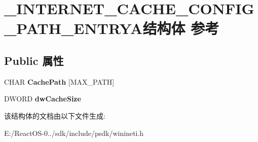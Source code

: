 \hypertarget{struct___i_n_t_e_r_n_e_t___c_a_c_h_e___c_o_n_f_i_g___p_a_t_h___e_n_t_r_y_a}{}\section{\+\_\+\+I\+N\+T\+E\+R\+N\+E\+T\+\_\+\+C\+A\+C\+H\+E\+\_\+\+C\+O\+N\+F\+I\+G\+\_\+\+P\+A\+T\+H\+\_\+\+E\+N\+T\+R\+Y\+A结构体 参考}
\label{struct___i_n_t_e_r_n_e_t___c_a_c_h_e___c_o_n_f_i_g___p_a_t_h___e_n_t_r_y_a}
\subsection*{Public 属性}
\begin{DoxyCompactItemize}
\item 
\mbox{\label{struct___i_n_t_e_r_n_e_t___c_a_c_h_e___c_o_n_f_i_g___p_a_t_h___e_n_t_r_y_a_a3f26ebd35648465a626968296bb44ce0}} 
C\+H\+AR {\bfseries Cache\+Path} \mbox{[}M\+A\+X\+\_\+\+P\+A\+TH\mbox{]}
\item 
\mbox{\label{struct___i_n_t_e_r_n_e_t___c_a_c_h_e___c_o_n_f_i_g___p_a_t_h___e_n_t_r_y_a_a1e72c4e697c2eb633cfbdbe033b76fed}} 
D\+W\+O\+RD {\bfseries dw\+Cache\+Size}
\end{DoxyCompactItemize}


该结构体的文档由以下文件生成\+:\begin{DoxyCompactItemize}
\item 
E\+:/\+React\+O\+S-\/0../sdk/include/psdk/winineti.\+h\end{DoxyCompactItemize}
